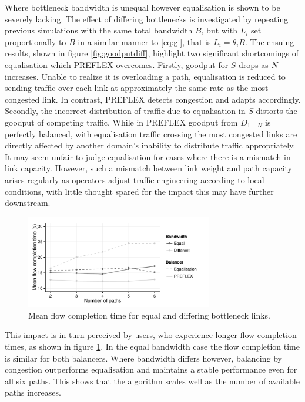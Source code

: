 Where bottleneck bandwidth is unequal however equalisation is shown to be severely lacking.
The effect of differing bottlenecks is investigated by repeating previous simulations with the same total bandwidth $B$, but with $L_i$ set proportionally to $B$ in a similar manner to \eqref{eq:gi}, that is $L_i = \theta_i B$.
The ensuing results, shown in figure \ref{fig:goodputdiff}, highlight two significant shortcomings of equalisation which \ac{PREFLEX} overcomes. 
Firstly, goodput for $S$ drops as $N$ increases. 
Unable to realize it is overloading a path, equalisation is reduced to sending traffic over each link at approximately the same rate as the most congested link. 
In contrast, \ac{PREFLEX} detects congestion and adapts accordingly. 
Secondly, the incorrect distribution of traffic due to equalisation in $S$ distorts the goodput of competing traffic. 
While in \ac{PREFLEX} goodput from $D_{1-N}$ is perfectly balanced, with equalisation traffic crossing the most congested links are directly affected by another domain's inability to distribute traffic appropriately.
It may seem unfair to judge equalisation for cases where there is a mismatch in link capacity.
However, such a mismatch between link weight and path capacity arises regularly as operators adjust traffic engineering according to local conditions, with little thought spared for the impact this may have further downstream.

\begin{figure}
    \centering
    \includegraphics[width=3.2in]{figures/cate/duration}
    \caption[Mean flow completion time.]{Mean flow completion time for equal and differing bottleneck links.}
    \label{fig:duration}
\end{figure}

This impact is in turn perceived by users, who experience longer flow completion times, as shown in figure \ref{fig:duration}. 
In the equal bandwidth case the flow completion time is similar for both balancers.  
Where bandwidth differs however, balancing by congestion outperforms equalisation and maintains a stable performance even for all six paths.  
This shows that the algorithm scales well as the number of available paths increases. 
